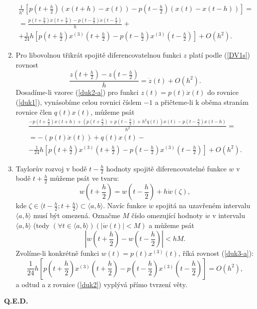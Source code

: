 \documentclass[a4paper, 12pt]{book}
\theoremstyle{definition}
\begin{document}
\begin{enumerate}
\begin{equation}
\begin{array}{l}
 \frac 1{h^2}\left[p(t+\frac h2) (x(t+h) - x(t))- p(t-\frac h2) (x(t) - x(t-h))\right] = \\
 = \frac {p(t+\frac h2)\dot x(t+\frac h2)-p(t-\frac h2)\dot x(t-\frac h2)}{h} + \\
 + \frac 1{24} h\left[p(t+\frac h2) x^{(3)}(t+\frac h2)-p(t-\frac h2) x^{(3)}(t-\frac h2)\right] + O(h^2).
\end{array}
\end{equation}
\item
Pro libovolnou třikrát spojitě diferencovatelnou funkci $z$ platí podle (\ref{DV1s})
rovnost
\begin{equation}\label{duk2-a}
 \frac{z(t+\frac h2)-z(t- \frac h2)}{h} = \dot z(t)+O(h^2).
\end{equation}
Dosadíme-li vzorec (\ref{duk2-a}) pro funkci $z(t)=p(t)\dot x(t)$ do rovnice (\ref{duk1}),
vynásobíme celou rovnici číslem $-1$ a přičteme-li k oběma stranám rovnice člen 
$q(t)x(t)$, můžeme psát
\begin{equation}\label{duk2}
\begin{array}{l}
 \frac {-p(t+\frac h2)x(t+h) + \left(p(t+\frac h2)+p(t-\frac h2)+h^2q(t)\right) x(t)- p(t-\frac h2) x(t-h)}{h^2} =\\
 =-(p(t)\dot x(t))\dot{}+ q(t)x(t)-\\
 - \frac 1{24} h\left[p(t+\frac h2) x^{(3)}(t+\frac h2)-p(t-\frac h2) x^{(3)}(t-\frac h2)\right] + O(h^2).
\end{array}
\end{equation}
\item 
Taylorův rozvoj v bodě $t-\frac h2$ hodnoty spojitě diferencovatelné funkce $w$ 
v bodě $t+\frac h2$ můžeme psát ve tvaru:
\begin{displaymath}
 w(t+\frac h2)=w(t-\frac h2) + h \dot w(\zeta),
\end{displaymath}
kde $\zeta\in\langle t-\frac h2; t+\frac h2\rangle\subset\langle a, b\rangle$.
Navíc funkce $\dot w$ spojitá na uzavřeném intervalu $\langle a, b\rangle$ musí být
omezená. Označme $M$ číslo omezující hodnoty $\dot w$ v intervalu $\langle a, b\rangle$
(tedy $(\forall t\in\langle a,b\rangle)(|\dot w(t)|<M)$ a můžeme psát
\begin{equation}\label{duk3-a}
 |w(t+\frac h2)-w(t-\frac h2)| < h M.
\end{equation}
Zvolíme-li konkrétně funkci $w(t)=p(t)x^{(3)}(t)$, říká rovnost (\ref{duk3-a}):
\begin{displaymath}
 \frac 1{24} h\left[p(t+\frac h2) x^{(3)}(t+\frac h2)-p(t-\frac h2) x^{(3)}(t-\frac h2)\right] = O(h^2),
\end{displaymath}
a odtud a z rovnice (\ref{duk2}) vyplývá přímo tvrzení věty.
\end{enumerate}
{\bf Q.E.D.}
\end{document}
